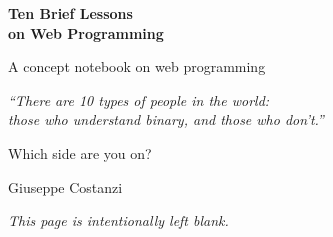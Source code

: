 \documentclass[11pt,a4paper,oneside]{book}
\begin{document}
\begin{titlepage}
\pagecolor{darkblue}
\begin{center}

\vspace*{6cm}

{\fontsize{28}{34}\selectfont\bfseries\color{white}
Ten Brief Lessons\\[0.4cm]on Web Programming}

\vspace{0.8cm}

{\large\color{white!80}
A concept notebook on web programming}

\vspace{2cm}

{\small\color{white!60}\itshape
``There are 10 types of people in the world:\\
those who understand binary, and those who don't.''}

\vspace{0.3cm}

{\small\color{white!80}
Which side are you on?}

\vspace{\fill}

{\large\color{white}
Giuseppe Costanzi}

\vspace{2cm}

\end{center}
\restoregeometry
\nopagecolor
\end{titlepage}

\thispagestyle{empty}
\vspace*{\fill}
\begin{center}
\textit{\color{gray}This page is intentionally left blank.}
\end{center}
\vspace*{\fill}
\newpage

\thispagestyle{empty}
\vspace*{\fill}
\end{document}
